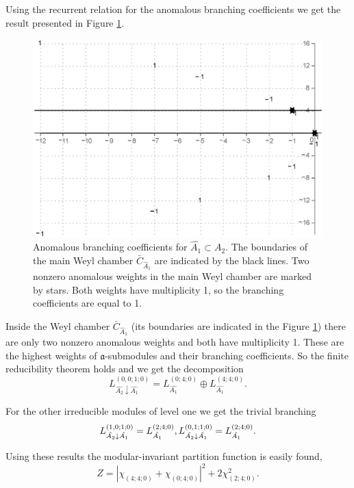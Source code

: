 \documentclass[12pt]{iopart}
\theoremstyle{definition}
\begin{document}
Using the recurrent relation for the anomalous branching coefficients
we get the result presented in Figure \ref{fig:AffineA2_A1_branching}.
\begin{figure}[h!tb]
  \centering
  \includegraphics[width=130mm]{figure9.eps}
  \caption{Anomalous branching coefficients for $\hat{A_1}\subset \hat{A_2}$. The boundaries  of the main Weyl chamber $\bar{C}_{\hat{A}_1}$
 are indicated by the black lines. Two nonzero anomalous weights in the main Weyl chamber are marked by stars. Both weights have multiplicity 1, so the branching coefficients are equal to 1.}
  \label{fig:AffineA2_A1_branching}
\end{figure}
Inside the Weyl chamber $\bar{C}_{\hat{A}_1}$
(its boundaries are indicated in the Figure \ref{fig:AffineA2_A1_branching})
there are only two nonzero anomalous weights and both have multiplicity 1.
These are the highest weights of $\mathfrak{a}$-submodules and their branching
coefficients. So the finite reducibility theorem holds and we get the decomposition
\begin{equation*}
  \label{eq:43}
  L^{(0,0;1;0)}_{\hat{A_2}\downarrow \hat{A_1}}= L_{\hat{A_1}}^{(0;4;0)}\oplus L_{\hat{A_1}}^{(4;4;0)}.
\end{equation*}

For the other irreducible modules of level one  we get the trivial
branching
\begin{equation*}
  \label{eq:44}
   L^{(1,0;1;0)}_{\hat{A_2}\downarrow \hat{A_1}}= L_{\hat{A_1}}^{(2;4;0)},\\
   L^{(0,1;1;0)}_{\hat{A_2}\downarrow \hat{A_1}}= L_{\hat{A_1}}^{(2;4;0)}.
\end{equation*}

Using these results the modular-invariant partition function is easily found,
\begin{equation*}
  \label{eq:45}
  Z=\left|\chi_{(4;4;0)}+\chi_{(0;4;0)}\right|^2+2\chi_{(2;4;0)}^2.
\end{equation*}
\end{document}
